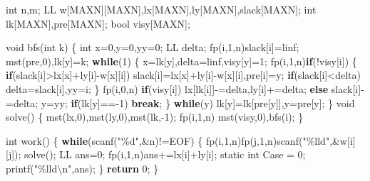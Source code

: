 \documentclass[
]{article}
\newenvironment{Shaded}{}{}
\newcommand{\AttributeTok}[1]{\textcolor[rgb]{0.49,0.56,0.16}{#1}}
\newcommand{\ControlFlowTok}[1]{\textcolor[rgb]{0.00,0.44,0.13}{\textbf{#1}}}
\newcommand{\DataTypeTok}[1]{\textcolor[rgb]{0.56,0.13,0.00}{#1}}
\newcommand{\DecValTok}[1]{\textcolor[rgb]{0.25,0.63,0.44}{#1}}
\newcommand{\NormalTok}[1]{#1}
\newcommand{\SpecialCharTok}[1]{\textcolor[rgb]{0.25,0.44,0.63}{#1}}
\newcommand{\StringTok}[1]{\textcolor[rgb]{0.25,0.44,0.63}{#1}}
\begin{document}
\begin{Shaded}
\begin{Highlighting}[]
\DataTypeTok{int}\NormalTok{ n,m;}
\NormalTok{LL w[MAXN][MAXN],lx[MAXN],ly[MAXN],slack[MAXN];}
\DataTypeTok{int}\NormalTok{ lk[MAXN],pre[MAXN];}
\DataTypeTok{bool}\NormalTok{ visy[MAXN];}

\DataTypeTok{void}\NormalTok{ bfs(}\DataTypeTok{int}\NormalTok{ k)}
\NormalTok{\{}
    \DataTypeTok{int}\NormalTok{ x=}\DecValTok{0}\NormalTok{,y=}\DecValTok{0}\NormalTok{,yy=}\DecValTok{0}\NormalTok{; LL delta;}
\NormalTok{    fp(i,}\DecValTok{1}\NormalTok{,n)slack[i]=linf;}
\NormalTok{    mst(pre,}\DecValTok{0}\NormalTok{),lk[y]=k;}
    \ControlFlowTok{while}\NormalTok{(}\DecValTok{1}\NormalTok{)}
\NormalTok{    \{}
\NormalTok{        x=lk[y],delta=linf,visy[y]=}\DecValTok{1}\NormalTok{;}
\NormalTok{        fp(i,}\DecValTok{1}\NormalTok{,n)}\ControlFlowTok{if}\NormalTok{(!visy[i])}
\NormalTok{        \{}
            \ControlFlowTok{if}\NormalTok{(slack[i]\textgreater{}lx[x]+ly[i]{-}w[x][i])}
\NormalTok{                slack[i]=lx[x]+ly[i]{-}w[x][i],pre[i]=y; }
            \ControlFlowTok{if}\NormalTok{(slack[i]\textless{}delta) delta=slack[i],yy=i;}
\NormalTok{        \}}
\NormalTok{        fp(i,}\DecValTok{0}\NormalTok{,n)}
            \ControlFlowTok{if}\NormalTok{(visy[i]) lx[lk[i]]{-}=delta,ly[i]+=delta;}
            \ControlFlowTok{else}\NormalTok{ slack[i]{-}=delta;}
\NormalTok{        y=yy;}
        \ControlFlowTok{if}\NormalTok{(lk[y]=={-}}\DecValTok{1}\NormalTok{) }\ControlFlowTok{break}\NormalTok{;}
\NormalTok{    \}}
    \ControlFlowTok{while}\NormalTok{(y) lk[y]=lk[pre[y]],y=pre[y];}
\NormalTok{\}}
\DataTypeTok{void}\NormalTok{ solve()}
\NormalTok{\{}
\NormalTok{    mst(lx,}\DecValTok{0}\NormalTok{),mst(ly,}\DecValTok{0}\NormalTok{),mst(lk,{-}}\DecValTok{1}\NormalTok{);}
\NormalTok{    fp(i,}\DecValTok{1}\NormalTok{,n) mst(visy,}\DecValTok{0}\NormalTok{),bfs(i);}
\NormalTok{\}}

\DataTypeTok{int}\NormalTok{ work()}
\NormalTok{\{}
    \ControlFlowTok{while}\NormalTok{(scanf(}\StringTok{"}\SpecialCharTok{\%d}\StringTok{"}\NormalTok{,\&n)!=EOF)}
\NormalTok{    \{}
\NormalTok{        fp(i,}\DecValTok{1}\NormalTok{,n)fp(j,}\DecValTok{1}\NormalTok{,n)scanf(}\StringTok{"}\SpecialCharTok{\%lld}\StringTok{"}\NormalTok{,\&w[i][j]);}
\NormalTok{        solve();}
\NormalTok{        LL ans=}\DecValTok{0}\NormalTok{;}
\NormalTok{        fp(i,}\DecValTok{1}\NormalTok{,n)ans+=lx[i]+ly[i];}
        \AttributeTok{static} \DataTypeTok{int}\NormalTok{ Case = }\DecValTok{0}\NormalTok{;}
\NormalTok{        printf(}\StringTok{"}\SpecialCharTok{\%lld\textbackslash{}n}\StringTok{"}\NormalTok{,ans);}
\NormalTok{    \}}
    \ControlFlowTok{return} \DecValTok{0}\NormalTok{;}
\NormalTok{\}}
\end{Highlighting}
\end{Shaded}
\end{document}
